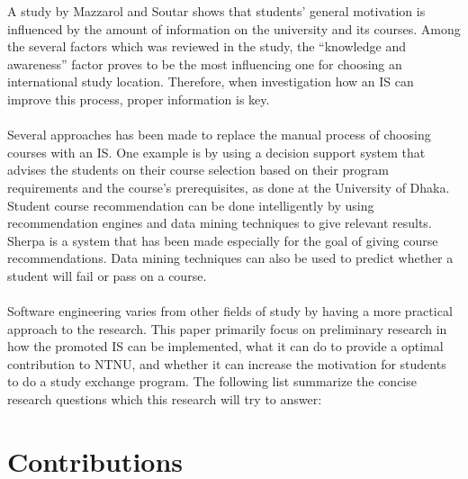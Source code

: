 A study by Mazzarol and Soutar\cite{Mazzarol} shows that students' general motivation is influenced by the amount of information on the university and its courses. Among the several factors which was reviewed in the study, the \enquote{knowledge and awareness} factor proves to be the most influencing one for choosing an international study location. Therefore, when investigation how an IS can improve this process, proper information is key. 
\\\\
Several approaches has been made to replace the manual process of choosing courses with an IS. One example is by using a decision support system that advises the students on their course selection based on their program requirements and the course's prerequisites, as done at the University of Dhaka\cite{Dhaka}. Student course recommendation can be done intelligently by using recommendation engines and data mining techniques to give relevant results. Sherpa\cite{Sherpa} is a system that has been made especially for the goal of giving course recommendations. Data mining techniques can also be used to predict whether a student will fail or pass on a course\cite{Vialardi}.
\\\\
Software engineering varies from other fields of study by having a more practical approach to the research. This paper primarily focus on preliminary research in how the promoted IS can be implemented, what it can do to provide a optimal contribution to NTNU, and whether it can increase the motivation for students to do a study exchange program. The following list summarize the concise research questions which this research will try to answer:\\

\section{Contributions}

